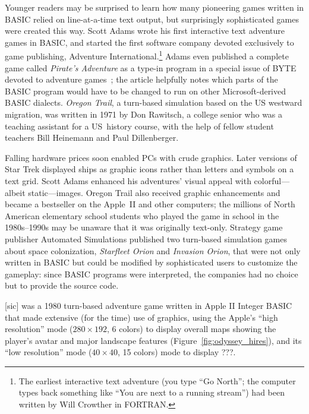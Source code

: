 Younger readers may be surprised to learn how many pioneering games
written in BASIC relied on line-at-a-time text output, but
surprisingly sophisticated games were created this way.
Scott Adams wrote his first interactive text adventure games in BASIC, and started
the first software company devoted exclusively to game publishing,
Adventure International.\footnote{The earliest interactive text adventure (you type
``Go North''; the computer types back something like ``You are next to a
running stream'') had been written by Will Crowther in FORTRAN.}
Adams even published a complete game called \emph{Pirate's Adventure} as
a type-in program in a special issue of BYTE devoted to adventure
games~\cite{byte80:adventure}; the article helpfully notes which parts
of the BASIC program would have to be changed to run on other
Microsoft-derived BASIC dialects.
\emph{Oregon Trail}, a turn-based simulation based on the US westward
migration, was written in 1971 by Don Rawitsch, a college senior who was
a teaching assistant for a US~history course, with the help of
fellow student teachers Bill Heinemann and Paul Dillenberger.

Falling hardware prices soon enabled PCs with crude graphics.
Later versions of Star Trek displayed ships as graphic icons rather than
letters and symbols on a text grid.
Scott Adams enhanced his adventures' visual appeal with colorful---albeit
static---images.
Oregon Trail also received graphic enhancements and became
a bestseller on the Apple~II and other computers;
the millions of
North American elementary school students who played the game in school
in the 1980s--1990s
may be unaware that it was originally text-only.
Strategy game publisher
Automated Simulations published two turn-based simulation games about
space colonization,
\emph{Starfleet Orion} and \emph{Invasion Orion}, that were not only
written in BASIC but could be modified by sophisticated users to
customize the gameplay: since BASIC programs were interpreted, the
companies had no choice but to provide the source code.

 [sic] was a 1980 turn-based adventure game
written in Apple II Integer BASIC
that made extensive (for the time) use of
graphics, using the Apple's ``high resolution'' mode ($280\times 192$, 6 colors)
to display overall maps showing the player's
avatar and major landscape features (Figure~\ref{fig:odyssey_hires}), and its
``low resolution'' mode ($40\times 40$, 15
colors) mode to display ???.

